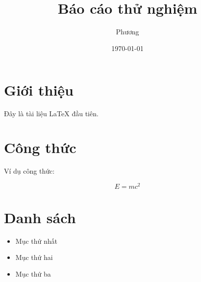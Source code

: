 \documentclass[12pt,a4paper]{article}
\title{Báo cáo thử nghiệm}
\author{Phương}
\date{\today}
\begin{document}
	
	\maketitle
	
	\section{Giới thiệu}
	
	Đây là tài liệu LaTeX đầu tiên.
	
	\section{Công thức}
	
	Ví dụ công thức:
	
	\[
	E = mc^2
	\]
	
	\section{Danh sách}
	
	\begin{itemize}
		\item Mục thứ nhất
		\item Mục thứ hai
		\item Mục thứ ba
	\end{itemize}
	
\end{document}
